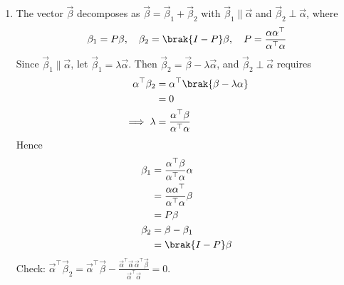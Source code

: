 \begin{enumerate}[label=\thesubsection.\arabic*, ref=\thesubsection.\theenumi]
\begin{align}
	\int f(x)\,dx + \int g(y)\,dy = C \label{eq:EE26BTECH11205-sepode}
\end{align}
\item The vector $\vec{\beta}$ decomposes as $\vec{\beta} = \vec{\beta}_1 + \vec{\beta}_2$ with $\vec{\beta}_1 \parallel \vec{\alpha}$ and $\vec{\beta}_2 \perp \vec{\alpha}$, where
\begin{align}
	\vec{\beta}_1 = \vec{P}\vec{\beta},\quad \vec{\beta}_2 = \brak{\vec{I}-\vec{P}}\vec{\beta},\quad \vec{P} = \frac{\vec{\alpha}\vec{\alpha}^{\top}}{\vec{\alpha}^{\top}\vec{\alpha}} \label{eq:EE26BTECH11205-proj}
\end{align}
\solution Since $\vec{\beta}_1 \parallel \vec{\alpha}$, let $\vec{\beta}_1 = \lambda\vec{\alpha}$. Then $\vec{\beta}_2 = \vec{\beta} - \lambda\vec{\alpha}$, and $\vec{\beta}_2 \perp \vec{\alpha}$ requires
\begin{align}
	\vec{\alpha}^{\top}\vec{\beta}_2 &= \vec{\alpha}^{\top}\brak{\vec{\beta} - \lambda\vec{\alpha}} \notag
	\\
	&= 0 \notag
	\\
	\implies \lambda &= \frac{\vec{\alpha}^{\top}\vec{\beta}}{\vec{\alpha}^{\top}\vec{\alpha}}
\end{align}
Hence
\begin{align}
	\vec{\beta}_1 &= \frac{\vec{\alpha}^{\top}\vec{\beta}}{\vec{\alpha}^{\top}\vec{\alpha}}\vec{\alpha} \notag
	\\
	&= \frac{\vec{\alpha}\vec{\alpha}^{\top}}{\vec{\alpha}^{\top}\vec{\alpha}}\vec{\beta} \notag
	\\
	&= \vec{P}\vec{\beta}
	\\
	\vec{\beta}_2 &= \vec{\beta} - \vec{\beta}_1 \notag
	\\
	&= \brak{\vec{I}-\vec{P}}\vec{\beta}
\end{align}
Check: $\vec{\alpha}^{\top}\vec{\beta}_2 = \vec{\alpha}^{\top}\vec{\beta} - \frac{\vec{\alpha}^{\top}\vec{\alpha}\,\vec{\alpha}^{\top}\vec{\beta}}{\vec{\alpha}^{\top}\vec{\alpha}} = 0$.


\end{enumerate}
